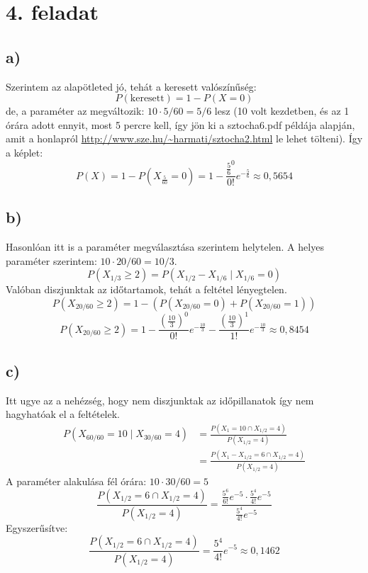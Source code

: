 \documentclass[a4paper,12pt]{article}   		%
\begin{document}
\section*{4. feladat}
\subsection*{a)}
Szerintem az alapötleted jó, tehát a keresett valószínűség:
\[P(\text{keresett}) = 1 - P(X = 0)\]
de, a paraméter az megváltozik: $10 \cdot 5/60 = 5/6$ lesz (10 volt kezdetben, 
és az 1 órára adott ennyit, most 5 percre kell, így jön ki a
\mbox{sztocha6.pdf} példája alapján, amit a honlapról 
\url{http://www.sze.hu/~harmati/sztocha2.html} le lehet tölteni). 
Így a képlet:
\[P(X) = 1 - P(X_\frac{5}{60} = 0) = 1 - \frac{\frac{5}{6}^0}{0!}e^{-\frac{5}{6}} \approx 0,5654\]

\subsection*{b)}
Hasonlóan itt is a paraméter megválasztása szerintem helytelen. A helyes 
paraméter szerintem: $10 \cdot 20/60 = 10/3$.
\[P(X_{1/3} \geq 2) = P(X_{1/2}-X_{1/6} \mid X_{1/6}=0)\]
Valóban diszjunktak az időtartamok, tehát a feltétel lényegtelen.
\[
P(X_{20/60} \geq 2) = 1 - \left( P(X_{20/60} = 0)+P(X_{20/60} = 1)\right)
\]
\[
P(X_{20/60} \geq 2) = 1 - \frac{\left(\frac{10}{3}\right)^0}{0!}e^{-\frac{10}{3}} - \frac{\left(\frac{10}{3}\right)^1}{1!}e^{-\frac{10}{3}} \approx 0,8454
\]

\subsection*{c)}
Itt ugye az a nehézség, hogy nem diszjunktak az időpillanatok így nem
hagyhatóak el a feltételek.
\begin{equation*}
\begin{split}
P(X_{60/60} = 10 \mid X_{30/60} = 4) &= \frac{P(X_1 = 10 \cap X_{1/2} = 4)}{P(X_{1/2} = 4)} \\
&= \frac{P(X_1-X_{1/2} = 6 \cap X_{1/2} = 4)}{P(X_{1/2} = 4)}
\end{split}
\end{equation*}
A paraméter alakulása fél órára: $10 \cdot 30/60 = 5$
\[
\frac{P(X_{1/2} = 6 \cap X_{1/2} = 4)}{P(X_{1/2} = 4)} = \frac{\frac{5^6}{6!}e^{-5} \cdot \frac{5^4}{4!} e^{-5}}{\frac{5^4}{4!} e^{-5}}
\]
Egyszerűsítve:
\[
\frac{P(X_{1/2} = 6 \cap X_{1/2} = 4)}{P(X_{1/2} = 4)} = \frac{5^4}{4!} e^{-5} \approx 0,1462
\]
\end{document}
